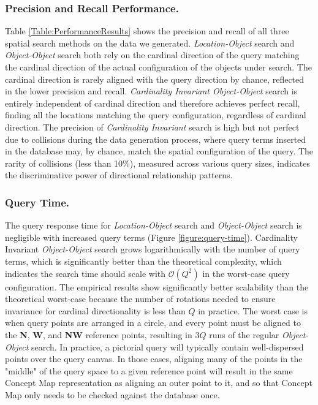 \subsubsection{Precision and Recall Performance.} 
Table \ref{Table:PerformanceResults} shows the precision and recall of all three spatial search methods on the data we generated.
\textit{Location-Object} search and \textit{Object-Object} search both rely on the cardinal direction of the query matching the cardinal direction of the actual configuration of the objects under search.
The cardinal direction is rarely aligned with the query direction by chance, reflected in the lower precision and recall.
\textit{Cardinality Invariant Object-Object} search is entirely independent of cardinal direction and therefore achieves perfect recall, finding all the locations matching the query configuration, regardless of cardinal direction.
The precision of \textit{Cardinality Invariant} search is high but not perfect due to collisions during the data generation process, where query terms inserted in the database may, by chance, match the spatial configuration of the query.
The rarity of collisions (less than 10\%), measured across various query sizes, indicates the discriminative power of directional relationship patterns.

\subsubsection{Query Time.}
The query response time for \textit{Location-Object} search and \textit{Object-Object} search is negligible with increased query terms (Figure \ref{figure:query-time}).
Cardinality Invariant \textit{Object-Object} search grows logarithmically with the number of query terms, which is significantly better than the theoretical complexity, which indicates the search time should scale with $\mathcal{O}(Q^2)$ in the worst-case query configuration.
The empirical results show significantly better scalability than the theoretical worst-case because the number of rotations needed to ensure invariance for cardinal directionality is less than $Q$ in practice. 
The worst case is when query points are arranged in a circle, and every point must be aligned to the \textbf{N}, \textbf{W}, and \textbf{NW} reference points, resulting in $3Q$ runs of the regular \textit{Object-Object} search.
In practice, a pictorial query will typically contain well-dispersed points over the query canvas.
In those cases, aligning many of the points in the "middle" of the query space to a given reference point will result in the same Concept Map representation as aligning an outer point to it, and so that Concept Map only needs to be checked against the database once.


